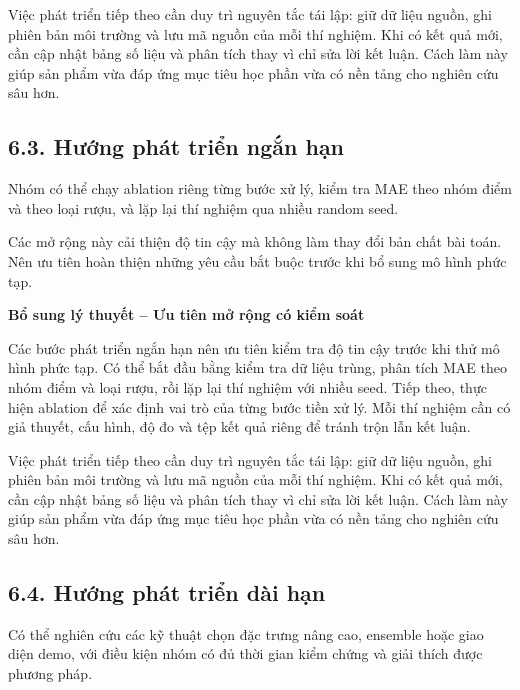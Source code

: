 \documentclass[12pt,a4paper,oneside]{article}
\begin{document}
Việc phát triển tiếp theo cần duy trì nguyên tắc tái lập: giữ dữ liệu nguồn, ghi phiên bản môi trường và lưu mã nguồn của mỗi thí nghiệm. Khi có kết quả mới, cần cập nhật bảng số liệu và phân tích thay vì chỉ sửa lời kết luận. Cách làm này giúp sản phẩm vừa đáp ứng mục tiêu học phần vừa có nền tảng cho nghiên cứu sâu hơn.\par

\subsection*{6.3. Hướng phát triển ngắn hạn}

Nhóm có thể chạy ablation riêng từng bước xử lý, kiểm tra MAE theo nhóm
điểm và theo loại rượu, và lặp lại thí nghiệm qua nhiều random seed.

Các mở rộng này cải thiện độ tin cậy mà không làm thay đổi bản chất bài
toán. Nên ưu tiên hoàn thiện những yêu cầu bắt buộc trước khi bổ sung mô
hình phức tạp.


\par\noindent\textbf{Bổ sung lý thuyết -- Ưu tiên mở rộng có kiểm soát}\par
Các bước phát triển ngắn hạn nên ưu tiên kiểm tra độ tin cậy trước khi thử mô hình phức tạp. Có thể bắt đầu bằng kiểm tra dữ liệu trùng, phân tích MAE theo nhóm điểm và loại rượu, rồi lặp lại thí nghiệm với nhiều seed. Tiếp theo, thực hiện ablation để xác định vai trò của từng bước tiền xử lý. Mỗi thí nghiệm cần có giả thuyết, cấu hình, độ đo và tệp kết quả riêng để tránh trộn lẫn kết luận.\par

Việc phát triển tiếp theo cần duy trì nguyên tắc tái lập: giữ dữ liệu nguồn, ghi phiên bản môi trường và lưu mã nguồn của mỗi thí nghiệm. Khi có kết quả mới, cần cập nhật bảng số liệu và phân tích thay vì chỉ sửa lời kết luận. Cách làm này giúp sản phẩm vừa đáp ứng mục tiêu học phần vừa có nền tảng cho nghiên cứu sâu hơn.\par

\subsection*{6.4. Hướng phát triển dài hạn}

Có thể nghiên cứu các kỹ thuật chọn đặc trưng nâng cao, ensemble hoặc
giao diện demo, với điều kiện nhóm có đủ thời gian kiểm chứng và giải
thích được phương pháp.
\end{document}
